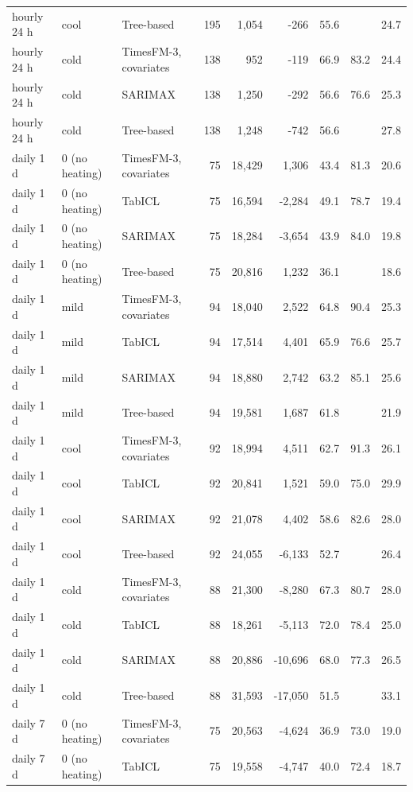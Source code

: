 \begin{tabular}{lllrrrrrr}
hourly 24 h & cool & Tree-based & 195 & 1,054 & -266 & 55.6 &  & 24.7 \\
hourly 24 h & cold & TimesFM-3, covariates & 138 & 952 & -119 & 66.9 & 83.2 & 24.4 \\
hourly 24 h & cold & SARIMAX & 138 & 1,250 & -292 & 56.6 & 76.6 & 25.3 \\
hourly 24 h & cold & Tree-based & 138 & 1,248 & -742 & 56.6 &  & 27.8 \\
daily 1 d & 0 (no heating) & TimesFM-3, covariates & 75 & 18,429 & 1,306 & 43.4 & 81.3 & 20.6 \\
daily 1 d & 0 (no heating) & TabICL & 75 & 16,594 & -2,284 & 49.1 & 78.7 & 19.4 \\
daily 1 d & 0 (no heating) & SARIMAX & 75 & 18,284 & -3,654 & 43.9 & 84.0 & 19.8 \\
daily 1 d & 0 (no heating) & Tree-based & 75 & 20,816 & 1,232 & 36.1 &  & 18.6 \\
daily 1 d & mild & TimesFM-3, covariates & 94 & 18,040 & 2,522 & 64.8 & 90.4 & 25.3 \\
daily 1 d & mild & TabICL & 94 & 17,514 & 4,401 & 65.9 & 76.6 & 25.7 \\
daily 1 d & mild & SARIMAX & 94 & 18,880 & 2,742 & 63.2 & 85.1 & 25.6 \\
daily 1 d & mild & Tree-based & 94 & 19,581 & 1,687 & 61.8 &  & 21.9 \\
daily 1 d & cool & TimesFM-3, covariates & 92 & 18,994 & 4,511 & 62.7 & 91.3 & 26.1 \\
daily 1 d & cool & TabICL & 92 & 20,841 & 1,521 & 59.0 & 75.0 & 29.9 \\
daily 1 d & cool & SARIMAX & 92 & 21,078 & 4,402 & 58.6 & 82.6 & 28.0 \\
daily 1 d & cool & Tree-based & 92 & 24,055 & -6,133 & 52.7 &  & 26.4 \\
daily 1 d & cold & TimesFM-3, covariates & 88 & 21,300 & -8,280 & 67.3 & 80.7 & 28.0 \\
daily 1 d & cold & TabICL & 88 & 18,261 & -5,113 & 72.0 & 78.4 & 25.0 \\
daily 1 d & cold & SARIMAX & 88 & 20,886 & -10,696 & 68.0 & 77.3 & 26.5 \\
daily 1 d & cold & Tree-based & 88 & 31,593 & -17,050 & 51.5 &  & 33.1 \\
daily 7 d & 0 (no heating) & TimesFM-3, covariates & 75 & 20,563 & -4,624 & 36.9 & 73.0 & 19.0 \\
daily 7 d & 0 (no heating) & TabICL & 75 & 19,558 & -4,747 & 40.0 & 72.4 & 18.7 \\

\end{tabular}
